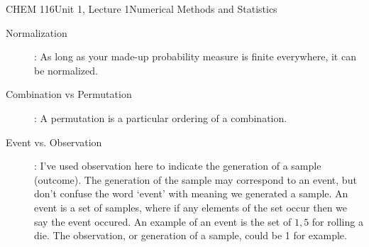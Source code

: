 \documentclass{article}
\begin{document}
\begin{tdoc}{CHEM 116}{Unit 1, Lecture 1}{Numerical Methods and Statistics}
\begin{description}
\item[Normalization]: As long as your made-up probability measure is
finite everywhere, it can be normalized.

\item[Combination vs Permutation]: A permutation is a particular
  ordering of a combination. 

\item[Event vs. Observation]: I've used observation here to indicate
  the generation of a sample (outcome). The generation of the sample
  may correspond to an event, but don't confuse the word `event' with
  meaning we generated a sample. An event is a set of samples, where
  if any elements of the set occur then we say the event occured. An
  example of an event is the set of ${1,5}$ for rolling a die. The
  observation, or generation of a sample, could be 1 for example.

\end{description}

\end{tdoc}
\end{document}
